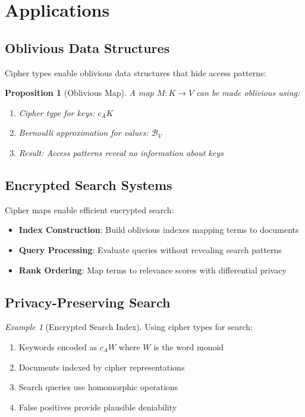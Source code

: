 \documentclass[11pt]{article}
\theoremstyle{definition}
\theoremstyle{plain}
\newtheorem{proposition}[theorem]{Proposition}
\theoremstyle{remark}
\newtheorem{example}{Example}[section]
\newcommand{\cipher}[1]{c_{#1}}
\newcommand{\Bernoulli}{\mathcal{B}}
\begin{document}
\section{Applications}
\label{sec:applications}

\subsection{Oblivious Data Structures}

Cipher types enable oblivious data structures that hide access patterns:

\begin{proposition}[Oblivious Map]
\label{prop:oblivious-map}
A map $M: K \to V$ can be made oblivious using:
\begin{enumerate}
\item Cipher type for keys: $\cipher{A}K$
\item Bernoulli approximation for values: $\Bernoulli_V$
\item Result: Access patterns reveal no information about keys
\end{enumerate}
\end{proposition}

\subsection{Encrypted Search Systems}

Cipher maps enable efficient encrypted search:
\begin{itemize}
\item \textbf{Index Construction}: Build oblivious indexes mapping terms to documents
\item \textbf{Query Processing}: Evaluate queries without revealing search patterns
\item \textbf{Rank Ordering}: Map terms to relevance scores with differential privacy
\end{itemize}

\subsection{Privacy-Preserving Search}

\begin{example}[Encrypted Search Index]
\label{ex:encrypted-search}
Using cipher types for search:
\begin{enumerate}
\item Keywords encoded as $\cipher{A}W$ where $W$ is the word monoid
\item Documents indexed by cipher representations
\item Search queries use homomorphic operations
\item False positives provide plausible deniability
\end{enumerate}
\end{example}
\end{document}
